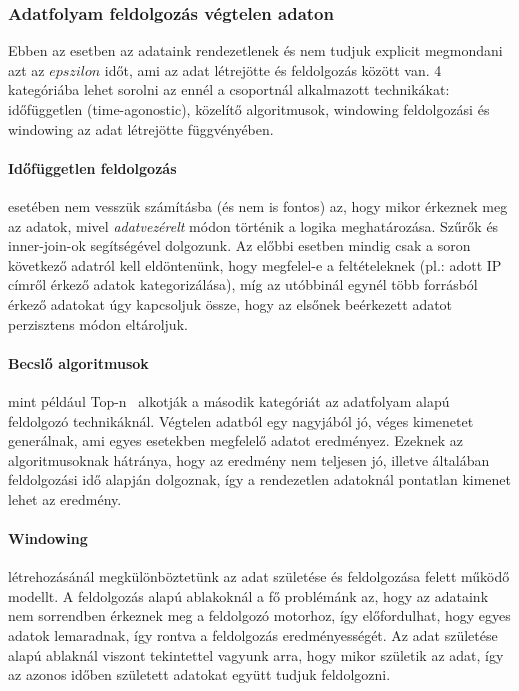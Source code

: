\documentclass[a4paper,12pt]{article}
\begin{document}
\subsubsection{Adatfolyam feldolgozás végtelen adaton}
Ebben az esetben az adataink rendezetlenek és nem tudjuk explicit megmondani azt az $epszilon$ időt, ami az adat létrejötte és feldolgozás között van. 4 kategóriába lehet sorolni az ennél a csoportnál alkalmazott technikákat: időfüggetlen (time-agonostic), közelítő algoritmusok, windowing feldolgozási és windowing az adat létrejötte függvényében. 

\paragraph{Időfüggetlen feldolgozás} esetében nem vesszük számításba (és nem is fontos) az, hogy mikor érkeznek meg az adatok, mivel \textsl{adatvezérelt} módon történik a logika meghatározása. Szűrők és inner-join-ok segítségével dolgozunk. Az előbbi esetben mindig csak a soron következő adatról kell eldöntenünk, hogy megfelel-e a feltételeknek (pl.: adott IP címről érkező adatok kategorizálása), míg az utóbbinál egynél több forrásból érkező adatokat úgy kapcsoljuk össze, hogy az elsőnek beérkezett adatot perzisztens módon eltároljuk. 

\paragraph{Becslő algoritmusok} mint például Top-n~\cite{topn} alkotják a második kategóriát az adatfolyam alapú feldolgozó technikáknál. Végtelen adatból egy nagyjából jó, véges kimenetet generálnak, ami egyes esetekben megfelelő adatot eredményez. Ezeknek az algoritmusoknak hátránya, hogy az eredmény nem teljesen jó, illetve általában feldolgozási idő alapján dolgoznak, így a rendezetlen adatoknál pontatlan kimenet lehet az eredmény.

\paragraph{Windowing} létrehozásánál megkülönböztetünk az adat születése és feldolgozása felett működő modellt. A feldolgozás alapú ablakoknál a fő problémánk az, hogy az adataink nem sorrendben érkeznek meg a feldolgozó motorhoz, így előfordulhat, hogy egyes adatok lemaradnak, így rontva a feldolgozás eredményességét. Az adat születése alapú ablaknál viszont tekintettel vagyunk arra, hogy mikor születik az adat, így az azonos időben született adatokat együtt tudjuk feldolgozni.
\end{document}

